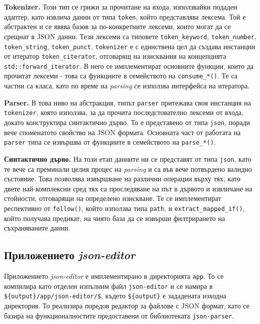 \documentclass[10pt]{article}
\begin{document}
\par
\textbf{Tokenizer.} Този тип се грижи за прочитане на входа, използвайки подаден адаптер, като извлича данни от типа \verb|token|, който представлява лексема. Той е абстрактен и се явява базов за по-конкретните лексеми, които могат да се срещнат в JSON данни. Тези лексеми са типовете \verb|token_keyword|, \verb|token_number|, \verb|token_string|, \verb|token_punct|. \verb|tokenizer| е с единствена цел да създава инстанции от итератор \verb|token_citerator|, отговарящ на изисквания на концепцията \verb|std::forward_iterator|. В него се имплементират основните функции, които да прочитат лексеми - това са функциите в семейството на \verb|consume_*()|. Те са частни са класа, като по време на \textit{parsing} се използва интерфейса на итератора.

\par
\textbf{Parser.} В това ниво на абстракция, типът \verb|parser| притежава своя инстанция на \verb|tokenizer|, която използва, за да прочита последстователно лексеми от входа, докато конструктира синтактично дърво. То е представено от типа \verb|json|, поради вече споменатото свойство на JSON формата. Основната част от работата на \verb|parser| типа се извършва от функциите в семейството на \verb|parse_*()|.

\par
\textbf{Синтактично дърво.} На този етап данните ни се представят от типа \verb|json|, като те вече са преминали целия процес на \textit{parsing} и са във вече потвърдено валидно състояние. Това позволява извършване на различни операции върху тях, като двете най-комплексни сред тях са проследяване на път в дървото и извличане на стойности, отговарящи на определено изискване. Те се имплементират респективно от \verb|follow()|, който използва типа \verb|path|, и \verb|extract_mapped_if()|, който получава предикат, на чиято база да се извърши филтрирането на съхраняваните данни.

\subsection{Приложението \textit{json-editor}}

\par
Приложението \textit{json-editor} е имплементирано в директорията \verb|app|. То се компилира като отделен изпълним файл \verb|json-editor| и се намира в \verb|${output}/app/json-editor/$|, където \verb|${output}| е зададената изходна директория. То реализира поредов редактор за файлове с JSON формат, като се базира на функционалностите предоставени от библиотеката \verb|json-parser|.
\end{document}
